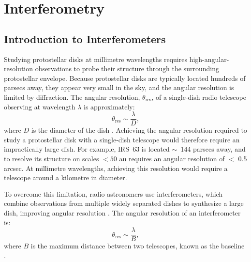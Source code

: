 \chapter{Interferometry}
\label{ch_interferometry}



\section{Introduction to Interferometers}
Studying protostellar disks at millimetre wavelengths requires high-angular-resolution observations to probe their structure through the surrounding protostellar envelope. Because protostellar disks are typically located hundreds of parsecs away, they appear very small in the sky, and the angular resolution is limited by diffraction. The angular resolution, $\theta_{\text{res}}$, of a single-dish radio telescope observing at wavelength $\lambda$ is approximately:
\begin{equation}
    \theta_{\text{res}}\sim \frac{\lambda}{D},
\end{equation}
\noindent where $D$ is the diameter of the dish \citep{Monnier}. Achieving the angular resolution required to study a protostellar disk with a single-dish telescope would therefore require an impractically large dish. For example, IRS~63 is located $\sim$~144 parsecs away, and to resolve its structure on scales $< 50$ au requires an angular resolution of $<$ 0.5 arcsec. At millimetre wavelengths, achieving this resolution would require a telescope around a kilometre in diameter. 


To overcome this limitation, radio astronomers use interferometers, which combine observations from multiple widely separated dishes to synthesize a large dish, improving angular resolution  \citep{Ludovici2026}. The angular resolution of an interferometer is:
\begin{equation}
    \theta_{\text{res}}\sim \frac{\lambda}{B}, 
\end{equation}
\noindent where $B$ is the maximum distance between two telescopes, known as the baseline \citep{Monnier}. 








